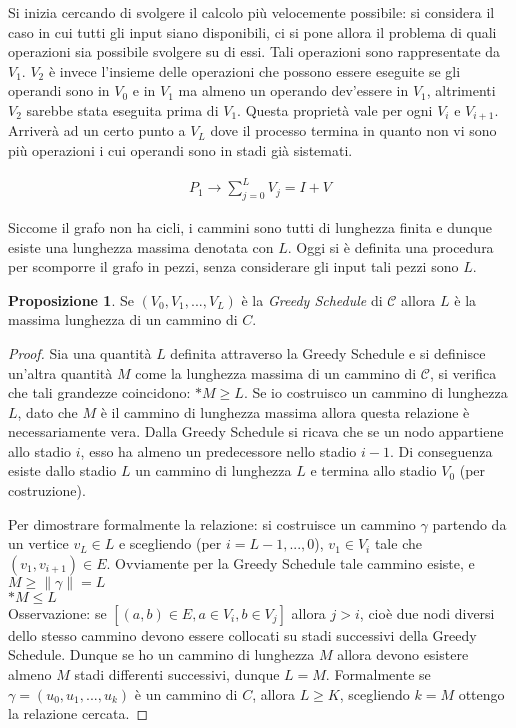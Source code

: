 \documentclass[a4paper,portrait,12pt]{article}
\theoremstyle{definition}
\newtheorem{proposition}{Proposizione}
\begin{document}
Si inizia cercando di svolgere il calcolo più velocemente possibile: si considera il caso in cui tutti gli input siano disponibili, ci si pone allora il problema di quali operazioni sia possibile svolgere su di essi.
Tali operazioni sono rappresentate da $V_1$. $V_2$ è invece l’insieme delle operazioni che possono essere eseguite se gli operandi sono in $V_0$ e in $V_1$ ma almeno un operando dev’essere in $V_1$, altrimenti $V_2$ sarebbe stata eseguita prima di $V_1$.
Questa proprietà vale per ogni $V_i$ e $V_{i+1}$. 
Arriverà ad un certo punto a $V_L$ dove il processo termina in quanto non vi sono più operazioni i cui operandi sono in stadi già sistemati.

\begin{align*}
P_1 \to \sum_{j=0}^L V_j = I + V
\end{align*}

Siccome il grafo non ha cicli, i cammini sono tutti di lunghezza finita e dunque esiste una lunghezza massima denotata con $L$.
Oggi si è definita una procedura per scomporre il grafo in pezzi, senza considerare gli input tali pezzi sono $L$.

\begin{proposition}
Se $(V_0,V_1,...,V_L)$ è la \textit{Greedy Schedule} di $\mathcal{C}$ allora $L$ è la massima lunghezza di un cammino di $C$.
\end{proposition}
\begin{proof}
Sia una quantità $L$ definita attraverso la Greedy Schedule e si definisce un’altra quantità $M$ come la lunghezza massima di un cammino di $\mathcal{C}$, si verifica che tali grandezze coincidono: $* M \ge L$.
Se io costruisco un cammino di lunghezza $L$, dato che $M$ è il cammino di lunghezza massima allora questa relazione è necessariamente vera.
Dalla Greedy Schedule si ricava che se un nodo appartiene allo stadio $i$, esso ha almeno un predecessore nello stadio $i-1$.
Di conseguenza esiste dallo stadio $L$ un cammino di lunghezza $L$ e termina allo stadio $V_0$ (per costruzione).

Per dimostrare formalmente la relazione: si costruisce un cammino $\gamma$ partendo da un vertice $v_L \in L$ e scegliendo (per $i = L-1,...,0$), $v_1 \in V_i$ tale che $(v_1, v_{i+1}) \in E$.
Ovviamente per la Greedy Schedule tale cammino esiste, e $M \ge \| \gamma \| = L$\\
$* M \le L$\\
Osservazione: se $[(a,b) \in E,a \in V_i, b \in V_j]$ allora $j > i$, cioè due nodi diversi dello stesso cammino devono essere collocati su stadi successivi della Greedy Schedule.
Dunque se ho un cammino di lunghezza $M$ allora devono esistere almeno $M$ stadi differenti successivi, dunque $L = M$.
Formalmente se $\gamma = (u_0, u_1,...,u_k)$ è un cammino di $C$, allora $L \ge K$, scegliendo $k = M$ ottengo la relazione cercata.
\end{proof}
\end{document}
